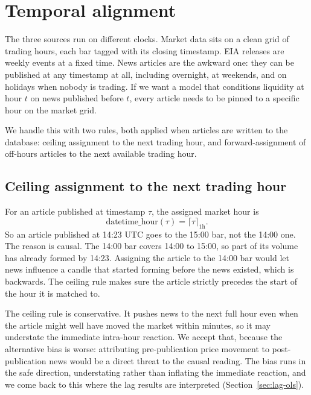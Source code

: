 \section{Temporal alignment}\label{sec:temporal-alignment}

The three sources run on different clocks. Market data sits on a clean grid of trading hours, each bar tagged with its closing timestamp. EIA releases are weekly events at a fixed time. News articles are the awkward one: they can be published at any timestamp at all, including overnight, at weekends, and on holidays when nobody is trading. If we want a model that conditions liquidity at hour $t$ on news published before $t$, every article needs to be pinned to a specific hour on the market grid.

We handle this with two rules, both applied when articles are written to the database: ceiling assignment to the next trading hour, and forward-assignment of off-hours articles to the next available trading hour.

\subsection{Ceiling assignment to the next trading hour}\label{sec:ceiling}

For an article published at timestamp $\tau$, the assigned market hour is
\begin{equation}
  \text{datetime\_hour}(\tau) = \lceil \tau \rceil_{\text{1h}} .
\end{equation}
So an article published at 14:23 UTC goes to the 15:00 bar, not the 14:00 one. The reason is causal. The 14:00 bar covers 14:00 to 15:00, so part of its volume has already formed by 14:23. Assigning the article to the 14:00 bar would let news influence a candle that started forming before the news existed, which is backwards. The ceiling rule makes sure the article strictly precedes the start of the hour it is matched to.

The ceiling rule is conservative. It pushes news to the next full hour even when the article might well have moved the market within minutes, so it may understate the immediate intra-hour reaction. We accept that, because the alternative bias is worse: attributing pre-publication price movement to post-publication news would be a direct threat to the causal reading. The bias runs in the safe direction, understating rather than inflating the immediate reaction, and we come back to this where the lag results are interpreted (Section~\ref{sec:lag-ols}).

